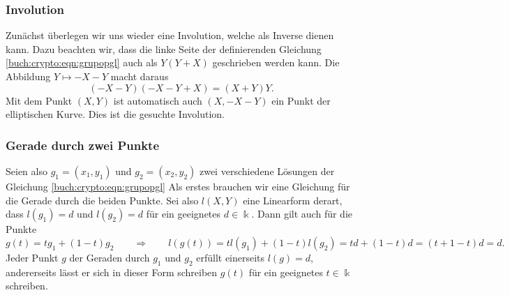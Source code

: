\subsubsection{Involution}
Zunächst überlegen wir uns wieder eine Involution, welche als Inverse
dienen kann.
Dazu beachten wir, dass die linke Seite der definierenden Gleichung
\eqref{buch:crypto:eqn:grupopgl}
auch als $Y(Y+X)$ geschrieben werden kann.
Die Abbildung $Y\mapsto -X-Y$ macht daraus
\[
(-X-Y)(-X-Y+X)=(X+Y)Y.
\]
Mit dem Punkt $(X,Y)$ ist automatisch auch $(X,-X-Y)$
ein Punkt der elliptischen Kurve.
Dies ist die gesuchte Involution.

\subsubsection{Gerade durch zwei Punkte}
Seien also $g_1=(x_1,y_1)$ und $g_2=(x_2,y_2)$ zwei verschiedene Lösungen
der Gleichung \eqref{buch:crypto:eqn:grupopgl}
Als erstes brauchen wir eine Gleichung für die Gerade durch die beiden
Punkte.
Sei also $l(X,Y)$ eine Linearform derart, dass $l(g_1)=d$ und $l(g_2)=d$
für ein geeignetes $d\in\Bbbk$.
Dann gilt auch für die Punkte
\[
g(t) = tg_1 + (1-t)g_2
\qquad\Rightarrow\qquad
l(g(t))
=
tl(g_1) + (1-t)l(g_2)
=
td+(1-t)d
=
(t+1-t)d
=d.
\]
Jeder Punkt $g$ der Geraden durch $g_1$ und $g_2$ erfüllt einerseits
$l(g)=d$, andererseits lässt er sich in dieser Form schreiben $g(t)$
für ein geeignetes $t\in\Bbbk$ schreiben.


